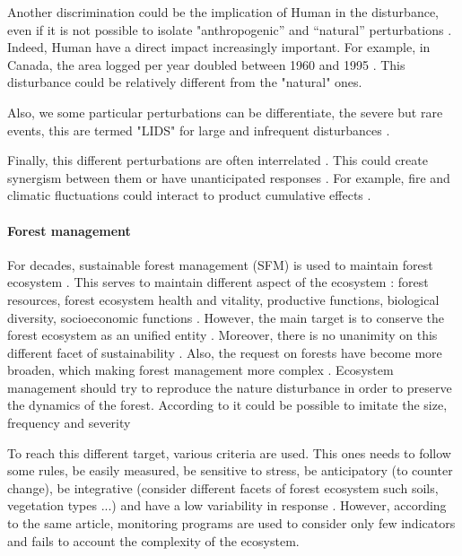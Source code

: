 \documentclass{article}
\begin{document}
Another discrimination could be the implication of Human in the disturbance, even if it is not possible to isolate "anthropogenic” and “natural” perturbations \cite{perera2015simulation}.
Indeed, Human have a direct impact increasingly important. For example, in Canada, the area logged per year doubled between 1960 and  1995 \cite{smith_canadas_2000}. This disturbance could be relatively different from the "natural" ones.

Also, we some particular perturbations can be differentiate, the severe but rare events, this are termed "LIDS" for large and infrequent disturbances \cite{foster1998landscape}.

Finally, this different perturbations are often interrelated \cite{keane2015exploring}. This could create synergism between them \cite{mandre_environmental_2011} or have  unanticipated responses \cite{perera2015simulation}. For example, fire and climatic fluctuations could interact to product cumulative effects \cite{romme2009historical}.



\paragraph{Forest management \\}
For decades, sustainable forest management (SFM) is used to maintain forest ecosystem \cite{macdicken2015global}. This serves to maintain different aspect of the ecosystem : forest resources,  forest ecosystem health and vitality, productive functions, biological diversity, socioeconomic functions \cite{makela_using_2012}. However, the main target is to conserve the forest ecosystem as an unified entity \cite{franklin1989toward}.
Moreover, there is no unanimity on this different facet of sustainability \cite{martinez-vega_assessing_2016}. Also, the request on forests have become more broaden, which making forest management more complex \cite{eggers2017balancing}. Ecosystem management should try to reproduce the nature disturbance \cite{bengston_changing_1994} \cite{bengtsson2000biodiversity} in order to preserve the dynamics of the forest. According to \cite{hunter1990wildlife} \cite{hunter1988paleoecology} it could be possible to imitate the size, frequency and severity

To reach this different target, various criteria are used. This ones needs to follow some rules, be easily measured, be sensitive to stress, be anticipatory (to counter change), be integrative (consider different facets of forest ecosystem such soils, vegetation types ...) and have a low variability in response \cite{dale2001challenges}. However, according to the same article, monitoring programs are used to consider only few indicators and fails to account the complexity of the ecosystem.
\end{document}
